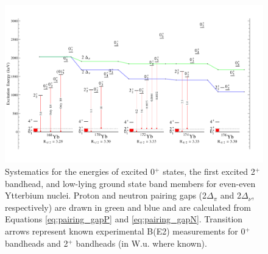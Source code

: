 \begin{landscape}
\begin{figure}[ht] 
\begin{center}
\includegraphics[height=0.8\textheight]{SciDraw_YbSystematics.pdf}
\caption{Systematics for the energies of excited 0$^+$ states, the first excited 2$^+$ bandhead, and low-lying ground state band members for even-even Ytterbium nuclei. Proton and neutron pairing gaps (2$\Delta_\pi$ and 2$\Delta_\nu$, respectively) are drawn in green and blue and are calculated from Equations \ref{eq:pairing_gapP} and \ref{eq:pairing_gapN}. Transition arrows represent known experimental B(E2) measurements for 0$^+$ bandheads and 2$^+$ bandheads (in W.u. where known).
\label{fig:YbSystematics}}
\end{center}
\end{figure}
\end{landscape}

